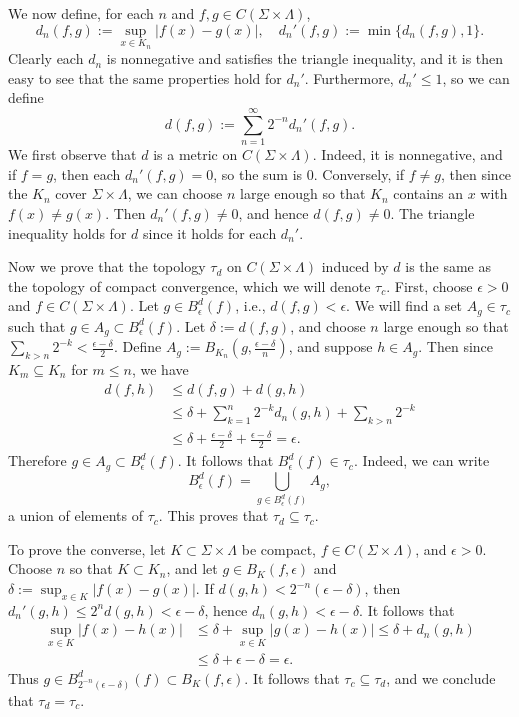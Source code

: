 \documentclass[12pt]{article}
\begin{document}
		We now define, for each $n$ and $f,g\in C(\Sigma\times\Lambda)$,
		\[
		d_n(f,g) := \sup_{x\in K_n} |f(x)-g(x)|,\quad d_n'(f,g) := \min\{d_n(f,g), 1\}.
		\]
		Clearly each $d_n$ is nonnegative and satisfies the triangle inequality, and it is then easy to see that the same properties hold for $d_n'$. Furthermore, $d_n'\leq 1$, so we can define
		\[
		d(f,g) := \sum_{n=1}^\infty 2^{-n} d_n'(f,g).
		\]
		We first observe that $d$ is a metric on $C(\Sigma\times\Lambda)$. Indeed, it is nonnegative, and if $f=g$, then each $d_n'(f,g)=0$, so the sum is 0. Conversely, if $f\neq g$, then since the $K_n$ cover $\Sigma\times\Lambda$, we can choose $n$ large enough so that $K_n$ contains an $x$ with $f(x)\neq g(x)$. Then $d_n'(f,g)\neq 0$, and hence $d(f,g)\neq 0$. The triangle inequality holds for $d$ since it holds for each $d_n'$.
		
		Now we prove that the topology $\tau_d$ on $C(\Sigma\times\Lambda)$ induced by $d$ is the same as the topology of compact convergence, which we will denote $\tau_c$. First, choose $\epsilon>0$ and $f\in C(\Sigma\times\Lambda)$. Let $g\in B^d_\epsilon(f)$, i.e., $d(f,g)<\epsilon$. We will find a set $A_g\in\tau_c$ such that $g\in A_g\subset B^d_\epsilon(f)$. Let $\delta := d(f,g)$, and choose $n$ large enough so that $\sum_{k>n} 2^{-k} < \frac{\epsilon-\delta}{2}$. Define $A_g := B_{K_n}(g,\frac{\epsilon-\delta}{n})$, and suppose $h\in A_g$. Then since $K_m\subseteq K_n$ for $m\leq n$, we have
		\begin{align*}
		d(f,h) &\leq d(f,g) + d(g,h)\\
		&\leq \delta + \sum_{k=1}^n 2^{-k}d_n(g,h) + \sum_{k>n} 2^{-k}\\
		&\leq \delta + \frac{\epsilon-\delta}{2} + \frac{\epsilon-\delta}{2} = \epsilon.
		\end{align*}
		Therefore $g\in A_g\subset B^d_\epsilon(f)$. It follows that $B^d_\epsilon(f)\in \tau_c$. Indeed, we can write
		\[
		B^d_\epsilon(f) = \bigcup_{g\in B^d_\epsilon(f)} A_g,
		\]
		a union of elements of $\tau_c$. This proves that $\tau_d\subseteq\tau_c$.
		
		To prove the converse, let $K\subset\Sigma\times\Lambda$ be compact, $f\in C(\Sigma\times\Lambda)$, and $\epsilon>0$. Choose $n$ so that $K\subset K_n$, and let $g\in B_K(f,\epsilon)$ and $\delta:= \sup_{x\in K} |f(x)-g(x)|$. If $d(g,h) < 2^{-n}(\epsilon-\delta)$, then $d_n'(g,h) \leq 2^n d(g,h) < \epsilon-\delta$, hence $d_n(g,h) < \epsilon-\delta$. It follows that
		\begin{align*}
		\sup_{x\in K} |f(x)-h(x)| &\leq \delta + \sup_{x\in K} |g(x)-h(x)| \leq \delta + d_n(g,h)\\
		&\leq \delta + \epsilon-\delta = \epsilon.
		\end{align*}
		Thus $g\in B^d_{2^{-n}(\epsilon-\delta)}(f) \subset B_K(f,\epsilon)$. It follows that $\tau_c\subseteq \tau_d$, and we conclude that $\tau_d = \tau_c$.
		
\end{document}

